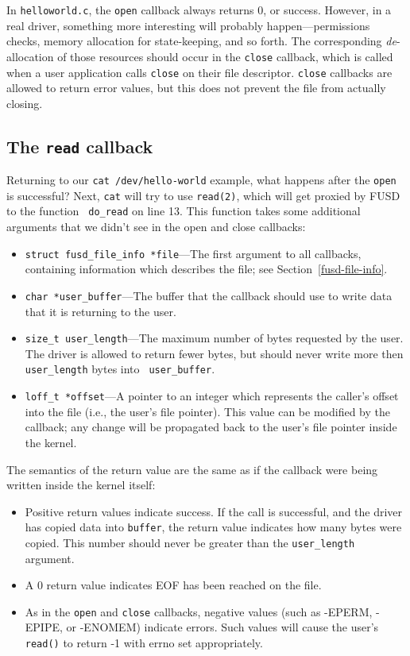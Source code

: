 \documentclass{article}
\begin{document}
In {\tt helloworld.c}, the {\tt open} callback always returns 0, or
success.  However, in a real driver, something more interesting will
probably happen---permissions checks, memory allocation for
state-keeping, and so forth.  The corresponding {\em de}-allocation of
those resources should occur in the {\tt close} callback, which is
called when a user application calls {\tt close} on their file
descriptor.  {\tt close} callbacks are allowed to return error values,
but this does not prevent the file from actually closing.



\subsection{The {\tt read} callback}
\label{read-callback}

Returning to our {\tt cat /dev/hello-world} example, what happens
after the {\tt open} is successful?  Next, {\tt cat} will try to use
{\tt read(2)}, which will get proxied by FUSD to the function {\tt
do\_read} on line 13.  This function takes some additional arguments
that we didn't see in the open and close callbacks:
\begin{itemize}
\item {\tt struct fusd\_file\_info *file}---The first argument to all
callbacks, containing information which describes the file; see
Section~\ref{fusd-file-info}.
\item {\tt char *user\_buffer}---The buffer that the callback should use to
write data that it is returning to the user.
\item {\tt size\_t user\_length}---The maximum number of bytes
requested by the user.  The driver is allowed to return fewer bytes,
but should never write more then {\tt user\_length} bytes into {\tt
user\_buffer}.
\item {\tt loff\_t *offset}---A pointer to an integer which represents
the caller's offset into the file (i.e., the user's file pointer).
This value can be modified by the callback; any change will be
propagated back to the user's file pointer inside the kernel.
\end{itemize}

The semantics of the return value are the same as if the
callback were being written inside the kernel itself:
\begin{itemize}
\item Positive return values indicate success.  If the call is
successful, and the driver has copied data into {\tt buffer}, the
return value indicates how many bytes were copied.  This number should
never be greater than the {\tt user\_length} argument.
\item A 0 return value indicates EOF has been reached on the file.
\item As in the {\tt open} and {\tt close} callbacks, negative values
(such as -EPERM, -EPIPE, or -ENOMEM) indicate errors. Such values will
cause the user's {\tt read()} to return -1 with errno set
appropriately.
\end{itemize}
\end{document}
